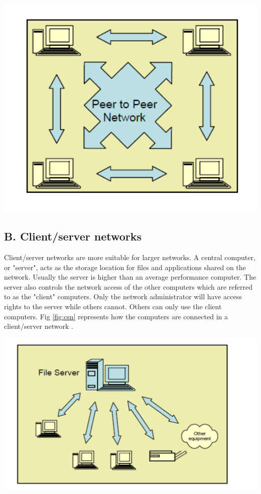 \documentclass[12pt]{article}
\newenvironment{Figure}
  {\par\medskip\noindent\minipage{\linewidth}}
  {\endminipage\par\medskip}
\begin{document}
\begin{multicols*}{2}
\begin{Figure}
 \centering
 \includegraphics[width=\linewidth]{peer.png}
\label{fig:p2p}
\end{Figure}

\subsection*{B. Client/server networks}
\indent \indent Client/server networks are more suitable for
larger networks. A central computer, or "server", acts as
the storage location for files and applications shared on
the network. Usually the server is higher than an
average performance computer. The server also controls
the network access of the other computers which are
referred to as the "client" computers. Only the network
administrator will have access rights to the server while
others cannot. Others can only use the client computers.
Fig \ref{fig:csn} represents how the computers are connected in a
client/server network \cite{4}.

\begin{Figure}
 \centering
 \includegraphics[width=\linewidth]{client.png}
\label{fig:csn}
\end{Figure}


\end{multicols*}
\end{document}
